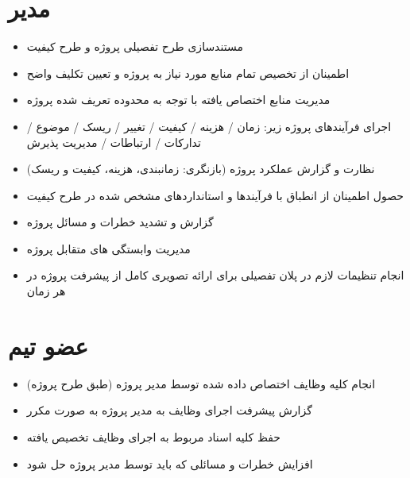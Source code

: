 \section{مدیر}
\begin{itemize}
\item مستندسازی طرح تفصیلی پروژه و طرح کیفیت
\item اطمینان از تخصیص تمام منابع مورد نیاز به پروژه و تعیین تکلیف واضح
\item مدیریت منابع اختصاص یافته با توجه به محدوده تعریف شده پروژه
\item اجرای فرآیندهای پروژه زیر: زمان / هزینه / کیفیت / تغییر / ریسک / موضوع / تدارکات / ارتباطات / مدیریت پذیرش
\item نظارت و گزارش عملکرد پروژه (بازنگری: زمانبندی، هزینه، کیفیت و ریسک)
\item حصول اطمینان از انطباق با فرآیندها و استانداردهای مشخص شده در طرح کیفیت
\item گزارش و تشدید خطرات و مسائل پروژه
\item مدیریت وابستگی های متقابل پروژه
\item انجام تنظیمات لازم در پلان تفصیلی برای ارائه تصویری کامل از پیشرفت پروژه در هر زمان
\end{itemize}

\section{عضو تیم}
\begin{itemize}
\item انجام کلیه وظایف اختصاص داده شده توسط مدیر پروژه (طبق طرح پروژه)
\item گزارش پیشرفت اجرای وظایف به مدیر پروژه به صورت مکرر
\item حفظ کلیه اسناد مربوط به اجرای وظایف تخصیص یافته
\item افزایش خطرات و مسائلی که باید توسط مدیر پروژه حل شود
\end{itemize}